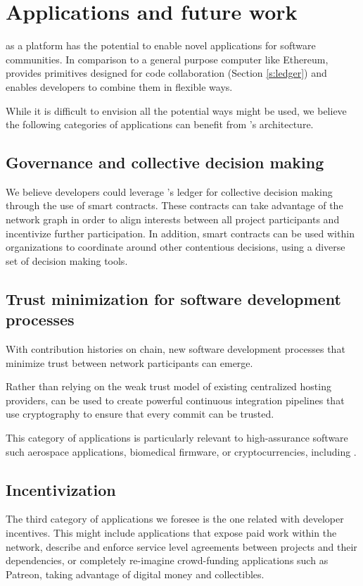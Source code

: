 
\section{Applications and future work}

\oscoin{} as a platform has the potential to enable novel applications for
software communities. In comparison to a general purpose computer like
Ethereum, \oscoin{} provides primitives designed for code collaboration
(Section \ref{s:ledger}) and enables developers to combine them in flexible ways.

While it is difficult to envision all the potential ways \oscoin{} might be used, we
believe the following categories of applications can benefit from \oscoin{}’s
architecture.

\subsection{Governance and collective decision making}

We believe developers could leverage \oscoin{}’s ledger for collective decision
making through the use of smart contracts. These contracts can take advantage of the
network graph in order to align interests between all project participants and
incentivize further participation. In addition, smart contracts can be used
within organizations to coordinate around other contentious decisions, using a
diverse set of decision making tools.

\subsection{Trust minimization for software development processes}
With contribution histories on chain, new software development processes that
minimize trust between network participants can emerge.

Rather than relying on the weak trust model of existing centralized hosting
providers, \oscoin{} can be used to create powerful continuous integration
pipelines that use cryptography to ensure that every commit can be trusted.

This category of applications is particularly relevant to high-assurance
software such aerospace applications, biomedical firmware, or cryptocurrencies,
including \oscoin{}.

\subsection{Incentivization}
The third category of applications we foresee is the one related with
developer incentives. This might include applications that expose paid work
within the \oscoin{} network, describe and enforce service level agreements
between projects and their dependencies, or completely re-imagine crowd-funding
applications such as Patreon, taking advantage of digital money and collectibles.

